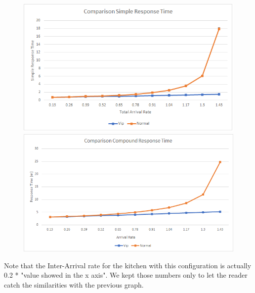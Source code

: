 \begin{figure}[h!]
  \begin{minipage}{0.48\textwidth}
    \centering
    \includegraphics[width=\textwidth]{figs/workloadSimple.png}
    \caption{}  %
    \label{}
  \end{minipage}\hspace{0.03\textwidth}
  \begin{minipage}{0.48\textwidth}
    \centering
    \includegraphics[width=\textwidth]{figs/workloadCompound.png}
    \caption{} %
    \label{}
  \end{minipage}
\end{figure}

Note that the Inter-Arrival rate for the kitchen with this configuration is actually 0.2 * "value showed in the x axis". We kept those numbers only to let the reader catch the similarities with the previous graph. %


